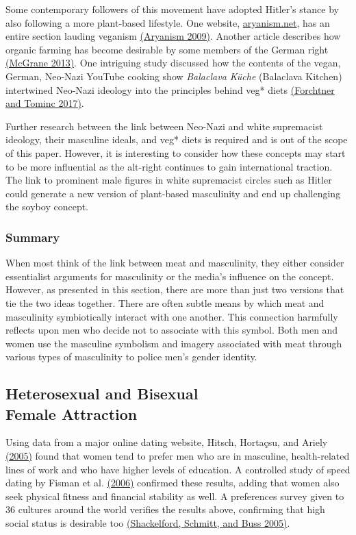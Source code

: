 \documentclass[twoside]{report}
\begin{document}
Some contemporary followers of this movement have adopted Hitler's stance by also following a more plant-based lifestyle. One website, \href{https://www.aryanism.net}{aryanism.net}, has an entire section lauding veganism \hyperlink{aryanism}{(Aryanism 2009)}. Another article describes how organic farming has become desirable by some members of the German right \hyperlink{mcgrane}{(McGrane 2013)}. One intriguing study discussed how the contents of the vegan, German, Neo-Nazi YouTube cooking show \textit{Balaclava Küche} (Balaclava Kitchen) intertwined Neo-Nazi ideology into the principles behind veg* diets \hyperlink{forchtner}{(Forchtner and Tominc 2017)}.

Further research between the link between Neo-Nazi and white supremacist ideology, their masculine ideals, and veg* diets is required and is out of the scope of this paper. However, it is interesting to consider how these concepts may start to be more influential as the alt-right continues to gain international traction. The link to prominent male figures in white supremacist circles such as Hitler could generate a new version of plant-based masculinity and end up challenging the soyboy concept.

\subsubsection{Summary}

When most think of the link between meat and masculinity, they either consider essentialist arguments for masculinity or the media's influence on the concept. However, as presented in this section, there are more than just two versions that tie the two ideas together. There are often subtle means by which meat and masculinity symbiotically interact with one another. This connection harmfully reflects upon men who decide not to associate with this symbol. Both men and women use the masculine symbolism and imagery associated with meat through various types of masculinity to police men's gender identity.

\subsection[Heterosexual and Bisexual Female Attraction]{Heterosexual and Bisexual\\ Female Attraction}

Using data from a major online dating website, Hitsch, Hortaçsu, and Ariely \hyperlink{hitsch1}{(2005)} found that women tend to prefer men who are in masculine, health-related lines of work and who have higher levels of education. A controlled study of speed dating by Fisman et al. \hyperlink{fisman}{(2006)} confirmed these results, adding that women also seek physical fitness and financial stability as well. A preferences survey given to 36 cultures around the world verifies the results above, confirming that high social status is desirable too \hyperlink{shackelford}{(Shackelford, Schmitt, and Buss 2005)}.
\end{document}
